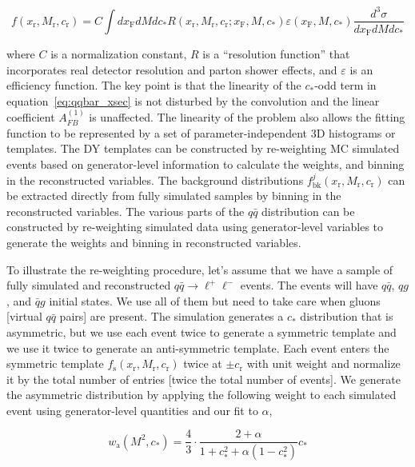 \documentclass[
    10pt, %
    a4paper, %
    oneside, %
    headinclude,footinclude, %
    BCOR5mm, %
]{scrartcl}
\begin{document}
\begin{equation}
    f(x_\mathrm{r},M_\mathrm{r},c_\mathrm{r}) = C \int dx_\mathrm{F}dMdc_* R(x_\mathrm{r},M_\mathrm{r},c_\mathrm{r}; x_\mathrm{F}, M, c_*)
    \varepsilon (x_\mathrm{F}, M, c_*) \frac{d^3\sigma}{dx_\mathrm{F}dM dc_*} 
\end{equation}

where $C$ is a normalization constant, $R$ is a ``resolution function'' that incorporates real detector resolution and parton shower effects, 
and $\varepsilon$ is an efficiency function.  
The key point is that the linearity of the $c_*$-odd term in equation~\ref{eq:qqbar_xsec} is not disturbed by the convolution and the linear coefficient $A_{FB}^{(1)}$ is unaffected.  
The linearity of the problem also allows the fitting function to be represented by a set of parameter-independent 3D histograms or templates.  
The DY templates can be constructed by re-weighting MC simulated events based on generator-level information to calculate the weights, and binning in 
the reconstructed variables. 
The background distributions $f^j_\mathrm{bk}(x_\mathrm{r},M_\mathrm{r},c_\mathrm{r})$ can be extracted directly from 
fully simulated samples by binning in the reconstructed variables.  
The various parts of the $q\bar q$ distribution can be constructed by re-weighting 
simulated data using generator-level variables to generate the weights and binning in reconstructed variables. 

To illustrate the re-weighting procedure, let's assume that we have a sample of fully simulated and reconstructed $q\bar q \to \ell^+\ell^-$ events.  
The events will have $q\bar q$, $qg$, and $\bar qg$ initial states.  
We use all of them but need to take care when gluons [virtual $q\bar q$ pairs] are present.  
The simulation generates a $c_*$ distribution that is asymmetric, but we use each event twice to generate a symmetric template 
and we use it twice to generate an anti-symmetric template.  
Each event enters the symmetric template $f_\mathrm{s}(x_\mathrm{r}, M_\mathrm{r}, c_\mathrm{r})$ twice at $\pm c_\mathrm{r}$ 
with unit weight and normalize it by the total number of entries [twice the total number of events].  
We generate the asymmetric distribution by applying the following weight to each simulated event using generator-level quantities and our fit to $\alpha$,

\begin{equation}
    w_\mathrm{a}(M^2, c_*) = \frac{4}{3}\cdot\frac{2+\alpha}{1+c_*^2+\alpha\left(1-c_*^2\right)}c_*
\end{equation}
\end{document}
